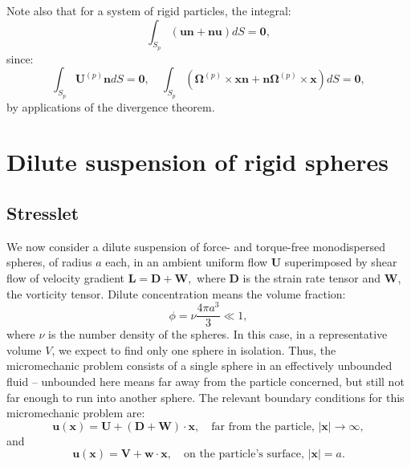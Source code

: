 \documentclass[english,fleqn,allpages]{ISTE_science}[2018/07/30]
\begin{document}
Note also that for a system of rigid particles, the integral: 
\[
\int_{S_{p}}\left(\mathbf{un}+\mathbf{nu}\right)dS=\mathbf{0},
\]
since: 
\[
\int_{S_{p}}\mathbf{U}^{(p)}\mathbf{n}dS=\mathbf{0},\quad\int_{S_{p}}\left(\mathbf{\Omega}^{(p)}\times\mathbf{xn}+\mathbf{n\Omega}^{(p)}\times\mathbf{x}\right)dS=\mathbf{0},
\]
by applications of the divergence theorem.


\section{Dilute suspension of rigid spheres}


\subsection{Stresslet}

We now consider a dilute suspension of force- and torque-free monodispersed
spheres, of radius $a$ each, in an ambient uniform flow $\mathbf{U}$
superimposed by shear flow of velocity gradient $\mathbf{L}=\mathbf{D}+\mathbf{W,}$
where $\mathbf{D}$ is the strain rate tensor and $\mathbf{W}$, the
vorticity tensor. Dilute concentration means the volume fraction:
\begin{equation}
\phi=\nu\frac{4\pi a^{3}}{3}\ll1,
\end{equation}
where $\nu$ is the number density of the spheres. In this case, in
a representative volume $V$, we expect to find only one sphere in
isolation. Thus, the micromechanic problem consists of a single sphere
in an effectively unbounded fluid -- unbounded here means far away
from the particle concerned, but still not far enough to run into another
sphere. The relevant boundary conditions for this micromechanic problem
are: 
\begin{equation}
\mathbf{u}\left(\mathbf{x}\right)=\mathbf{U}+(\mathbf{D}+\mathbf{W})\cdot\mathbf{x},\quad\text{far from the particle, }\left\vert \mathbf{x}\right\vert \rightarrow\infty,
\end{equation}
and 
\begin{equation}
\mathbf{u}\left(\mathbf{x}\right)=\mathbf{V}+\mathbf{w}\cdot\mathbf{x},\quad\text{on the particle's surface, }\left\vert \mathbf{x}\right\vert =a.
\end{equation}
\end{document}

